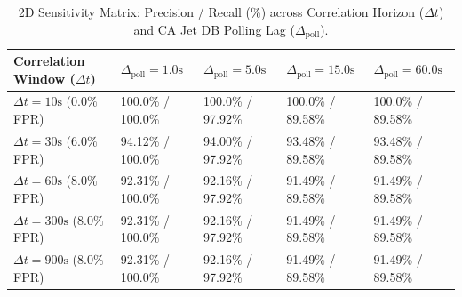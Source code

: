 \begin{table}[htbp]
\centering
\small
\caption{2D Sensitivity Matrix: Precision / Recall (\%) across Correlation Horizon ($\Delta t$) and CA Jet DB Polling Lag ($\Delta_{\text{poll}}$).}
\label{tab:sensitivity_tradeoff_matrix}
\begin{tabularx}{\textwidth}{lXXXX}
\toprule
\textbf{Correlation Window ($\Delta t$)} & \textbf{$\Delta_{\text{poll}} = 1.0\text{s}$} & \textbf{$\Delta_{\text{poll}} = 5.0\text{s}$} & \textbf{$\Delta_{\text{poll}} = 15.0\text{s}$} & \textbf{$\Delta_{\text{poll}} = 60.0\text{s}$} \\
\midrule
$\Delta t = 10\text{s}$ ($0.0\%$ FPR) & 100.0\% / 100.0\% & 100.0\% / 97.92\% & 100.0\% / 89.58\% & 100.0\% / 89.58\% \\
$\Delta t = 30\text{s}$ ($6.0\%$ FPR) & 94.12\% / 100.0\% & 94.00\% / 97.92\% & 93.48\% / 89.58\% & 93.48\% / 89.58\% \\
$\Delta t = 60\text{s}$ ($8.0\%$ FPR) & 92.31\% / 100.0\% & 92.16\% / 97.92\% & 91.49\% / 89.58\% & 91.49\% / 89.58\% \\
$\Delta t = 300\text{s}$ ($8.0\%$ FPR) & 92.31\% / 100.0\% & 92.16\% / 97.92\% & 91.49\% / 89.58\% & 91.49\% / 89.58\% \\
$\Delta t = 900\text{s}$ ($8.0\%$ FPR) & 92.31\% / 100.0\% & 92.16\% / 97.92\% & 91.49\% / 89.58\% & 91.49\% / 89.58\% \\
\bottomrule
\end{tabularx}
\end{table}

